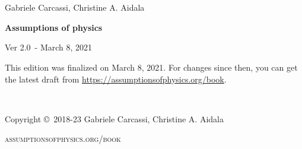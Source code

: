 \documentclass[11pt,letterpaper,fleqn]{memoir} %
\newif\ifdraft
\newcommand{\bookversion}{2.0}
\newcommand{\bookdate}{March 8, 2021}
\begin{document}
	





\frontmatter
\thispagestyle{empty} %

\newpage
\thispagestyle{empty}
~
\newpage

~
\thispagestyle{empty}

\vspace{20pt}

{\large \noindent Gabriele Carcassi, Christine A. Aidala }

\vspace{60pt}

{\Huge \noindent \textbf{Assumptions of physics}}

\vspace{30pt}

\ifdraft {\large \noindent Working DRAFT for Ver \bookversion  ~- \today}
\else {\large \noindent Ver \bookversion  ~- \bookdate}
\fi

\vfill


\ifdraft 
\noindent \textbf{This book is a work in progress}. This draft is a development copy built on \today. It is provided as-is for the purpose of early review and feedback. You can get the latest draft from \url{https://assumptionsofphysics.org/book}. 
\else
\noindent This edition was finalized on \bookdate. For changes since then, you can get the latest draft from \url{https://assumptionsofphysics.org/book}.
\fi

\newpage
~\vfill
\thispagestyle{empty}

\noindent Copyright \copyright\ 2018-23 Gabriele Carcassi, Christine A. Aidala

\vspace{12pt}

\noindent \textsc{assumptionsofphysics.org/book}
\end{document}
